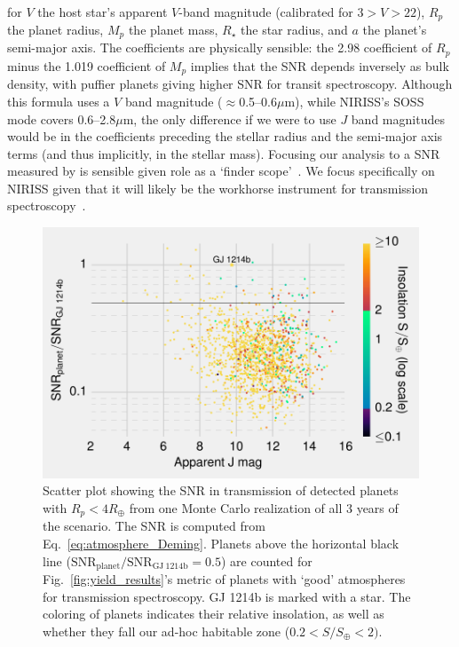 \begin{enumerate}
\begin{align*}
	\label{eq:atmosphere_Deming}
	\end{align*}
	for $V$ the host star's apparent $V$-band magnitude (calibrated for $3>V>22$), $R_p$ the planet radius, $M_p$ the planet mass, $R_\star$ the star radius, and $a$ the planet's semi-major axis.
	The coefficients are physically sensible: the 2.98 coefficient of $R_p$ minus the 1.019 coefficient of $M_p$ implies that the SNR depends inversely as bulk density, with puffier planets giving higher SNR for transit spectroscopy.
	Although this formula uses a $V$ band magnitude ($\approx$0.5--0.6$\mu$m), while NIRISS's SOSS mode covers 0.6--2.8$\mu$m, the only difference if we were to use $J$ band magnitudes would be in the coefficients preceding the stellar radius and the semi-major axis terms (and thus implicitly, in the stellar mass).
	Focusing our analysis to a SNR measured by \jwst is sensible given \tesss role as a `\jwst finder scope'~\citep{deming_jwst_tess_2009}.
	We focus specifically on NIRISS given that it will likely be the workhorse \jwst instrument for transmission spectroscopy~\citep{beichman_observations_2014}.
	\begin{figure}[!th]
		\centering
		\includegraphics[]{figures/SNR_in_transmission.pdf}
		\caption{ Scatter plot showing the SNR in transmission of detected planets with $R_p<4R_\oplus$ from one Monte Carlo realization of all 3 years of the \npole\:scenario.
			The SNR is computed from Eq.~\protect\ref{eq:atmosphere_Deming}.
			Planets above the horizontal black line ($\mathrm{SNR_{planet}/SNR_{GJ\ 1214b}} = 0.5$) are counted for Fig.~\protect\ref{fig:yield_results}'s metric of planets with `good' atmospheres for transmission spectroscopy.
			GJ 1214b is marked with a star.
			The coloring of planets indicates their relative insolation, as well as whether they fall our ad-hoc habitable zone ($0.2<S/S_\oplus<2)$.
		}
		\label{fig:atmosphere_scatter}
	\end{figure}


\end{enumerate}

